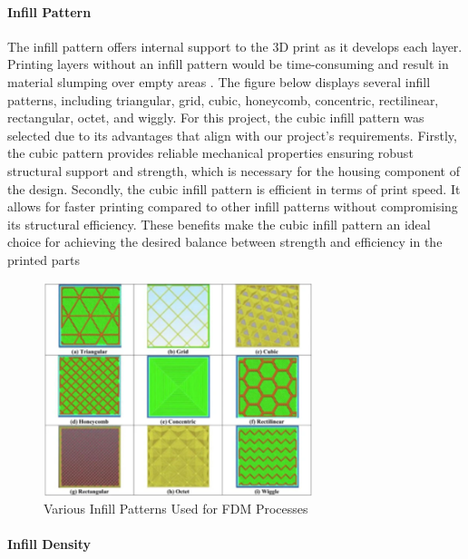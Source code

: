 \paragraph{Infill Pattern}

The infill pattern offers internal support to the 3D print as it develops each layer. 
Printing layers without an infill pattern would be time-consuming and result in material slumping over empty areas \cite{RefWorks:RefID:88-srinivasan2020impact}. 
The figure below displays several infill patterns, including triangular, grid, cubic, honeycomb, concentric, rectilinear, rectangular, octet, and wiggly. 
For this project, the cubic infill pattern was selected due to its advantages that align with our project's requirements. 
Firstly, the cubic pattern provides reliable mechanical properties ensuring robust structural support and strength, which is necessary for the housing component of the design. 
Secondly, the cubic infill pattern is efficient in terms of print speed. 
It allows for faster printing compared to other infill patterns without compromising its structural efficiency. 
These benefits make the cubic infill pattern an ideal choice for achieving the desired balance between strength and efficiency in the printed parts

\begin{figure}[htbp]
    \centering
    \includegraphics[width=0.7\textwidth]{figures/CAD-3DPrint/infillPatterns.png}
    \caption{Various Infill Patterns Used for FDM Processes}
    \label{fig:infillpatterns}
    
\end{figure}

\paragraph{Infill Density}

